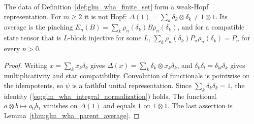 \begin{lemma}
    \label{thm:glm_wha_finite_set}
    \leanok
    The data of Definition~\ref{def:glm_wha_finite_set} form a weak-Hopf
    representation. For $m\geq2$ it is not Hopf:
    $\Delta(1)=\sum_k\delta_k\otimes\delta_k\neq1\otimes1$. Its average is
    the pinching $E_n(B)=\sum_k\rho_n(\delta_k)B\rho_n(\delta_k)$, and for a
    compatible state tensor that is $L$-block injective for some $L$,
    $\sum_k\rho_n(\delta_k)P_n\rho_n(\delta_k)=P_n$ for every $n>0$.
\end{lemma}
\begin{proof}
    \leanok
    Writing $x=\sum_kx_k\delta_k$ gives
    $\Delta(x)=\sum_k\delta_k\otimes x_k\delta_k$, and
    $\delta_k\delta_l=\delta_{kl}\delta_k$ gives multiplicativity and star
    compatibility. Convolution of functionals is pointwise on the idempotents,
    so $\psi$ is a faithful unital representation. Since
    $\sum_k\delta_k\delta_k=1$, the identity
    (\ref{eq:glm_wha_integral_normalization}) holds. The functional
    $a\otimes b\mapsto a_0b_1$ vanishes on $\Delta(1)$ and equals $1$ on
    $1\otimes1$. The last assertion is
    Lemma~\ref{thm:glm_wha_parent_average}.
\end{proof}

